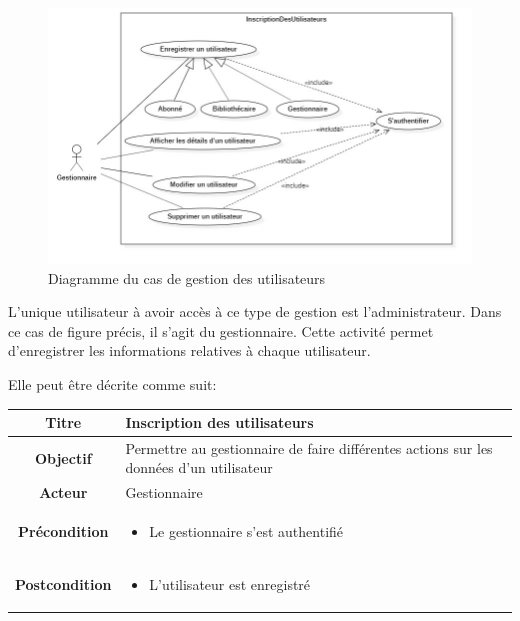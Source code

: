 \paragraph{}
\begin{figure}[h]
        \centering
        \includegraphics[width=1\textwidth]{gestionDesUtilisateursUseCase}
        \caption{Diagramme du cas de gestion des utilisateurs}
        \label{image-gestionDesUtilisateursUseCase}
        \end{figure}
\par 
L'unique utilisateur à avoir accès à ce type de gestion est l'administrateur. Dans 
ce cas de figure précis, il s'agit du gestionnaire. Cette activité 
permet d'enregistrer les informations relatives à chaque utilisateur. \par 
Elle peut être décrite comme suit: \par 
\begin{tabular}{|c|p{7cm}|}
        \hline
        \textbf{Titre} & Inscription des utilisateurs \\
        \hline
        \textbf{Objectif} & Permettre au gestionnaire de faire différentes actions sur les 
        données d'un utilisateur \\
        \hline
        \textbf{Acteur} & Gestionnaire \\
        \hline
        \textbf{Précondition} & \begin{itemize}
                \item Le gestionnaire s'est authentifié 
        \end{itemize} \\
        \hline
        \textbf{Postcondition} & \begin{itemize}
                \item L'utilisateur est enregistré 
        \end{itemize} \\
        \hline
\end{tabular}
